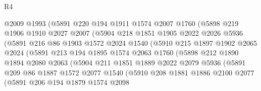 \begin{lexlean}{R4}
\begin{coremodule}
                  @2009
                  @1993
                  (@5891
                    @220
                    @194
                    @1911
                    @1574
                    @2007
                    @1760
                    (@5898
                      @219
                      @1906
                      @1910
                      @2027
                      @2007
                      (@5904
                        @218
                        @1851
                        @1905
                        @2022
                        @2026
                        @5936
                        (@5891
                          @216
                          @86
                          @1903
                          @1572
                          @2024
                          @1540
                          (@5910
                            @215
                            @1897
                            @1902
                            @2065
                            @2024
                            (@5891
                              @213
                              @194
                              @1895
                              @1574
                              @2063
                              @1760
                              (@5898
                                @212
                                @1890
                                @1894
                                @2080
                                @2063
                                (@5904
                                  @211
                                  @1851
                                  @1889
                                  @2022
                                  @2079
                                  @5936
                                  (@5891
                                    @209
                                    @86
                                    @1887
                                    @1572
                                    @2077
                                    @1540
                                    (@5910
                                      @208
                                      @1881
                                      @1886
                                      @2100
                                      @2077
                                      (@5891
                                        @206
                                        @194
                                        @1879
                                        @1574
                                        @2098

\end{coremodule}
\end{lexlean}
